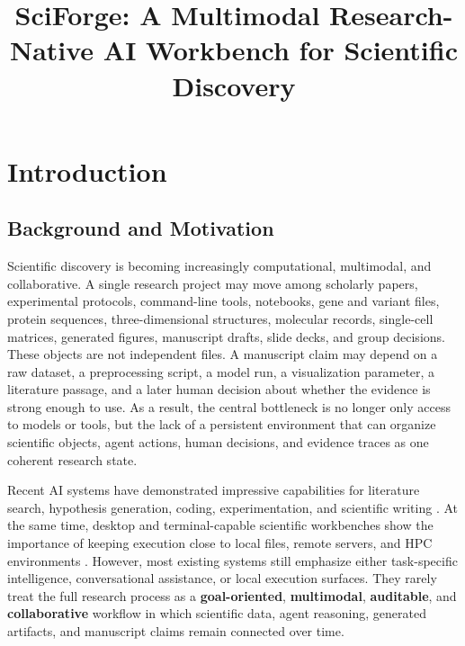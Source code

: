 \documentclass[sn-basic,Numbered,pdflatex]{sn-jnl}
\title[SciForge: Multimodal Research-Native AI Workbench]{SciForge: A Multimodal Research-Native AI Workbench for Scientific Discovery}
\author*[1]{\fnm{Author} \sur{Names}}\email{author@example.com}
\affil*[1]{\orgdiv{Institute}, \orgname{University}, \orgaddress{\city{City}, \country{Country}}}
\begin{document}
\maketitle

\vspace{-12pt}
\section{Introduction}

\subsection{Background and Motivation}

Scientific discovery is becoming increasingly computational, multimodal, and collaborative. A single research project may move among scholarly papers, experimental protocols, command-line tools, notebooks, gene and variant files, protein sequences, three-dimensional structures, molecular records, single-cell matrices, generated figures, manuscript drafts, slide decks, and group decisions. These objects are not independent files. A manuscript claim may depend on a raw dataset, a preprocessing script, a model run, a visualization parameter, a literature passage, and a later human decision about whether the evidence is strong enough to use. As a result, the central bottleneck is no longer only access to models or tools, but the lack of a persistent environment that can organize scientific objects, agent actions, human decisions, and evidence traces as one coherent research state.

Recent AI systems have demonstrated impressive capabilities for literature search, hypothesis generation, coding, experimentation, and scientific writing \cite{futureHousePlatform2025,googleCoScientist2025,sakanaAIScientist2024,agentLaboratory2025,paperQA2024}. At the same time, desktop and terminal-capable scientific workbenches show the importance of keeping execution close to local files, remote servers, and HPC environments \cite{anthropicClaudeScience2026,omicOSOverview2026,omicsClaw2026,operonGitHub2026,claudePrism2026}. However, most existing systems still emphasize either task-specific intelligence, conversational assistance, or local execution surfaces. They rarely treat the full research process as a \textbf{goal-oriented}, \textbf{multimodal}, \textbf{auditable}, and \textbf{collaborative} workflow in which scientific data, agent reasoning, generated artifacts, and manuscript claims remain connected over time.
\end{document}
